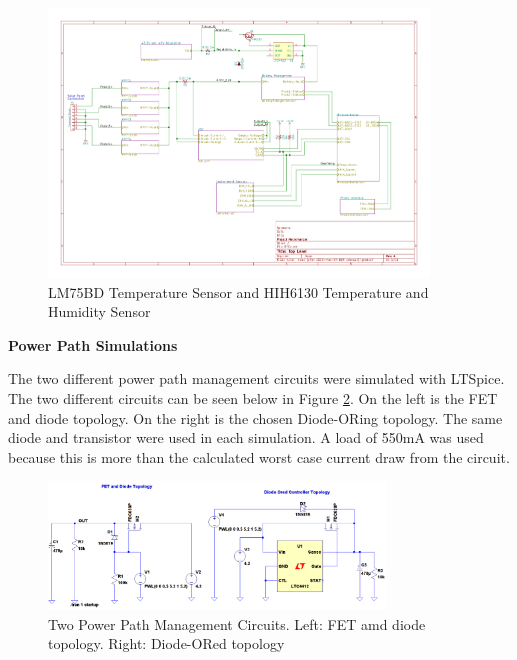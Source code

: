 \documentclass{article}
\numberwithin{figure}{section}
\numberwithin{equation}{section}
\begin{document}
{\begin{figure}[H]
	\centering
	\includegraphics[page=11,width=0.9\textwidth]{RFCxSchematics.pdf}
	\caption{LM75BD Temperature Sensor and HIH6130 Temperature and Humidity Sensor}
	\label{fig:schemp11}
\end{figure}

\newpage
\textbf{Power Path Simulations}

The two different power path management circuits were simulated with LTSpice. The two different circuits can be seen below in Figure \ref{fig:doredsim}. On the left is the FET and diode topology. On the right is the chosen Diode-ORing topology. The same diode and transistor were used in each simulation. A load of 550mA was used because this is more than the calculated worst case current draw from the circuit.

\begin{figure}[H]
	\centering
	\includegraphics[width=0.8\textwidth]{DiodeORSIM}
	\caption{Two Power Path Management Circuits. Left: FET amd diode topology. Right: Diode-ORed topology}
	\label{fig:doredsim}
\end{figure}

}
\end{document}
